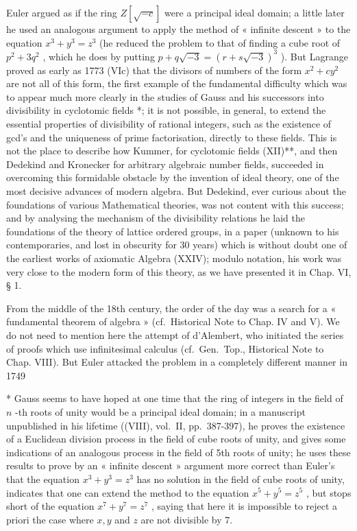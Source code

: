 Euler argued as if the ring \(Z[\sqrt{-c}]\) were a principal ideal domain; a little later he used an analogous argument to apply the method of « infinite descent » to the equation \(x^{3} + y^{3} = z^{3}\) (he reduced the problem to that of finding a cube root of \(p^{2} + 3q^{2}\) , which he does by putting \(p + q\sqrt{-3} = (r + s\sqrt{-3})^{3}\) ). But Lagrange proved as early as 1773 (VIc) that the divisors of numbers of the form \(x^{2} + cy^{2}\) are not all of this form, the first example of the fundamental difficulty which was to appear much more clearly in the studies of Gauss and his successors into divisibility in cyclotomic fields *; it is not possible, in general, to extend the essential properties of divisibility of rational integers, such as the existence of gcd's and the uniqueness of prime factorisation, directly to these fields. This is not the place to describe how Kummer, for cyclotomic fields (XII)**, and then Dedekind and Kronecker for arbitrary algebraic number fields, succeeded in overcoming this formidable obstacle by the invention of ideal theory, one of the most decisive advances of modern algebra. But Dedekind, ever curious about the foundations of various Mathematical theories, was not content with this success; and by analysing the mechanism of the divisibility relations he laid the foundations of the theory of lattice ordered groups, in a paper (unknown to his contemporaries, and lost in obscurity for 30 years) which is without doubt one of the earliest works of axiomatic Algebra (XXIV); modulo notation, his work was very close to the modern form of this theory, as we have presented it in Chap. VI, § 1.

From the middle of the 18th century, the order of the day was a search for a « fundamental theorem of algebra » (cf.~Historical Note to Chap. IV and V). We do not need to mention here the attempt of d'Alembert, who initiated the series of proofs which use infinitesimal calculus (cf.~Gen.~Top., Historical Note to Chap. VIII). But Euler attacked the problem in a completely different manner in 1749

* Gauss seems to have hoped at one time that the ring of integers in the field of \(n\) -th roots of unity would be a principal ideal domain; in a manuscript unpublished in his lifetime ((VIII), vol.~II, pp.~387-397), he proves the existence of a Euclidean division process in the field of cube roots of unity, and gives some indications of an analogous process in the field of 5th roots of unity; he uses these results to prove by an « infinite descent » argument more correct than Euler's that the equation \(x^3 + y^3 = z^3\) has no solution in the field of cube roots of unity, indicates that one can extend the method to the equation \(x^5 + y^5 = z^5\) , but stops short of the equation \(x^7 + y^7 = z^7\) , saying that here it is impossible to reject a priori the case where \(x, y\) and \(z\) are not divisible by 7.

